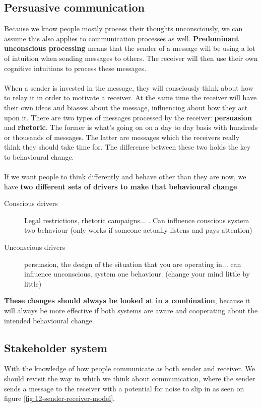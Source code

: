 \documentclass[../summary.tex]{subfiles}
\begin{document}
		\subsection{Persuasive communication}
			Because we know people mostly process their thoughts unconsciously, we can assume this also applies to communication processes as well. \textbf{Predominant unconscious processing} means that the sender of a message will be using a lot of intuition when sending messages to others. The receiver will then use their own cognitive intuitions to process these messages. 
			\\\\
			When a sender is invested in the message, they will consciously think about how to relay it in order to motivate a receiver. At the same time the receiver will have their own ideas and biasses about the message, influencing about how they act upon it. There are two types of messages processed by the receiver: \textbf{persuasion} and \textbf{rhetoric}. The former is what's going on on a day to day basis with hundreds or thousands of messages. The latter are messages which the receivers really think they should take time for. The difference between these two holds the key to behavioural change.
			\\\\
			If we want people to think differently and behave other than they are now, we have \textbf{two different sets of drivers to make that behavioural change}.
			\begin{description}
				\item[Conscious drivers] Legal restrictions, rhetoric campaigns... . Can influence conscious system two behaviour (only works if someone actually listens and pays attention)
				\item[Unconscious drivers] persuasion, the design of the situation that you are operating in... can influence unconscious, system one behaviour.  (change your mind little by little)
			\end{description}
			\textbf{These changes should always be looked at in a combination}, because it will always be more effective if both systems are aware and cooperating about the intended behavioural change.
			
		\subsection{Stakeholder system}
			With the knowledge of how people communicate as both sender and receiver. We should revisit the way in which we think about communication, where the sender sends a message to the receiver with a potential for noise to slip in as seen on figure \ref{fig:12-sender-receiver-model}. \\
			
\end{document}
